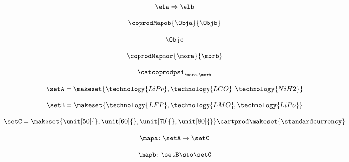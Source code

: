 {\begin{forslides}
        \begin{equation}
            \label{eq:combination-084}
            \ela \Rightarrow \elb
        \end{equation}

        \begin{equation}
            \label{eq:combination-085}
            \coprodMapob{\Obja}{\Objb}
        \end{equation}

        \begin{equation}
            \label{eq:combination-086}
            \Objc
        \end{equation}

        \begin{equation}
            \label{eq:combination-087}
            \coprodMapmor{\mora}{\morb}
        \end{equation}

        \begin{equation}
            \label{eq:combination-088}
            \catcoprodpsi_{\mora, \morb}
        \end{equation}

        \begin{equation}
            \label{eq:combination-089}
            \setA=\makeset{\technology{LiPo}, \technology{LCO},\technology{NiH2}}
        \end{equation}

        \begin{equation}
            \label{eq:combination-090}
            \setB=\makeset{\technology{LFP},\technology{LMO},\technology{LiPo}}
        \end{equation}

        \begin{equation}
            \label{eq:combination-091}
            \setC=\makeset{\unit[50]{},\unit[60]{},\unit[70]{},\unit[80]{}}\cartprod \makeset{\text{\standardcurrency}}
        \end{equation}

        \begin{equation}
            \label{eq:combination-092}
            \mapa \colon \setA\to \setC
        \end{equation}

        \begin{equation}
            \label{eq:combination-093}
            \mapb\colon \setB \sto \setC
        \end{equation}


\end{forslides}}
